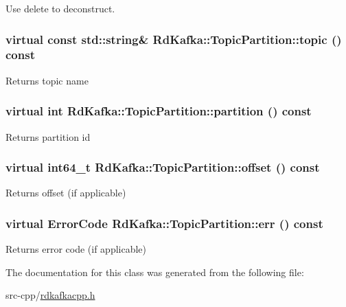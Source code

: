 Use {\ttfamily delete} to deconstruct. \hypertarget{classRdKafka_1_1TopicPartition_a1e1d34726a70a1109f67202f74d1e6b4}{
\subsubsection[{topic}]{\setlength{\rightskip}{0pt plus 5cm}virtual const std::string\& RdKafka::TopicPartition::topic () const}}
\label{classRdKafka_1_1TopicPartition_a1e1d34726a70a1109f67202f74d1e6b4}
\begin{DoxyReturn}{Returns}
topic name 
\end{DoxyReturn}
\hypertarget{classRdKafka_1_1TopicPartition_aac977298931c0488e0c759c896aa7418}{
\subsubsection[{partition}]{\setlength{\rightskip}{0pt plus 5cm}virtual int RdKafka::TopicPartition::partition () const}}
\label{classRdKafka_1_1TopicPartition_aac977298931c0488e0c759c896aa7418}
\begin{DoxyReturn}{Returns}
partition id 
\end{DoxyReturn}
\hypertarget{classRdKafka_1_1TopicPartition_adaa8701081082dd24e8897d1f2b3f75d}{
\subsubsection[{offset}]{\setlength{\rightskip}{0pt plus 5cm}virtual int64\_\-t RdKafka::TopicPartition::offset () const}}
\label{classRdKafka_1_1TopicPartition_adaa8701081082dd24e8897d1f2b3f75d}
\begin{DoxyReturn}{Returns}
offset (if applicable) 
\end{DoxyReturn}
\hypertarget{classRdKafka_1_1TopicPartition_adf4cd4ca1ed51f1829fddd475b96adee}{
\subsubsection[{err}]{\setlength{\rightskip}{0pt plus 5cm}virtual ErrorCode RdKafka::TopicPartition::err () const}}
\label{classRdKafka_1_1TopicPartition_adf4cd4ca1ed51f1829fddd475b96adee}
\begin{DoxyReturn}{Returns}
error code (if applicable) 
\end{DoxyReturn}


The documentation for this class was generated from the following file:\begin{DoxyCompactItemize}
\item 
src-\/cpp/\hyperlink{rdkafkacpp_8h}{rdkafkacpp.h}\end{DoxyCompactItemize}
